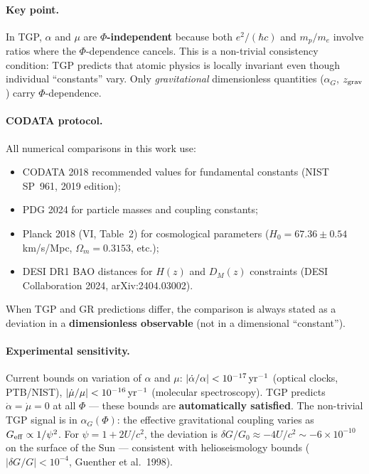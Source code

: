 \paragraph{Key point.}
In TGP, $\alpha$ and $\mu$ are \textbf{$\Phi$-independent}
because both $e^2/(\hbar c)$ and $m_p/m_e$ involve ratios
where the $\Phi$-dependence cancels.  This is a non-trivial
consistency condition: TGP predicts that atomic physics is
locally invariant even though individual ``constants'' vary.
Only \emph{gravitational} dimensionless quantities ($\alpha_G$,
$z_{\rm grav}$) carry $\Phi$-dependence.

\paragraph{CODATA protocol.}
All numerical comparisons in this work use:
\begin{itemize}[nosep]
  \item CODATA 2018 recommended values for fundamental constants
        (NIST SP~961, 2019 edition);
  \item PDG 2024 for particle masses and coupling constants;
  \item Planck 2018 (VI, Table~2) for cosmological parameters
        ($H_0 = 67.36 \pm 0.54$\,km/s/Mpc, $\Omega_m = 0.3153$, etc.);
  \item DESI DR1 BAO distances for $H(z)$ and $D_M(z)$ constraints
        (DESI Collaboration 2024, arXiv:2404.03002).
\end{itemize}
When TGP and GR predictions differ, the comparison is always
stated as a deviation in a \textbf{dimensionless observable}
(not in a dimensional ``constant'').

\paragraph{Experimental sensitivity.}
Current bounds on variation of $\alpha$ and $\mu$:
$|\dot\alpha/\alpha| < 10^{-17}\,{\rm yr}^{-1}$ (optical clocks, PTB/NIST),
$|\dot\mu/\mu| < 10^{-16}\,{\rm yr}^{-1}$ (molecular spectroscopy).
TGP predicts $\dot\alpha = \dot\mu = 0$ at all $\Phi$ ---
these bounds are \textbf{automatically satisfied}.
The non-trivial TGP signal is in $\alpha_G(\Phi)$: the effective
gravitational coupling varies as $G_{\rm eff} \propto 1/\psi^2$.
For $\psi = 1 + 2U/c^2$, the deviation is
$\delta G/G_0 \approx -4U/c^2 \sim -6 \times 10^{-10}$
on the surface of the Sun --- consistent with helioseismology
bounds ($|\delta G/G| < 10^{-4}$, Guenther et al.\ 1998).
